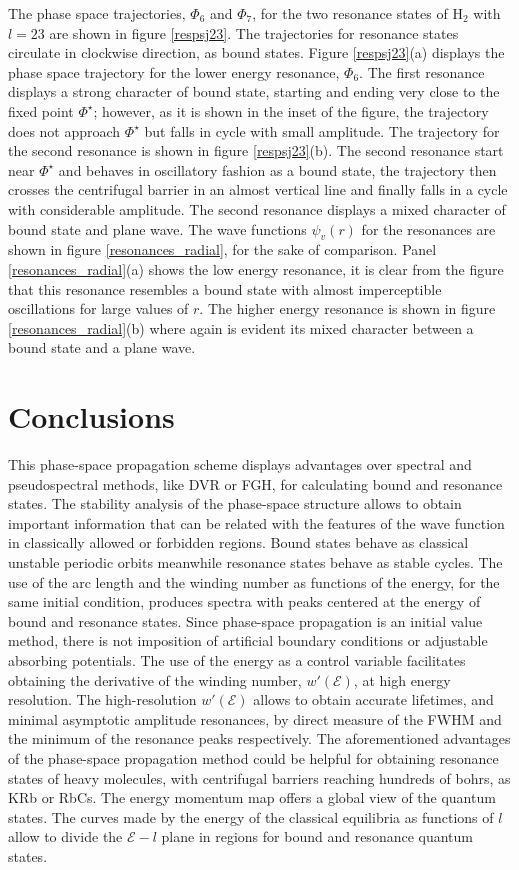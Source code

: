 \documentclass[%
 aip,
 numerical,
 jcp,
 floatfix,
rsi,%
amsmath,amssymb,
reprint,%
author-year%
]{revtex4-1}
\begin{document}
The phase space trajectories, $\Phi_6$ and $\Phi_7$, for the two resonance states of $\mathrm{H}_2$ with $l=23$ are shown in figure \ref{respsj23}. The trajectories for resonance states circulate in clockwise direction, as bound states. Figure \ref{respsj23}(a) displays the phase space trajectory for the lower energy resonance, $\Phi_6$. The first resonance displays a strong character of bound state, starting and ending very close to the fixed point $\Phi^\star$; however, as it is shown in the inset of the figure, the trajectory does not approach $\Phi^\star$ but falls in cycle with small amplitude. The trajectory for the second resonance is shown in figure \ref{respsj23}(b). The second resonance start near $\Phi^\star$ and behaves in oscillatory fashion as a bound state, the trajectory then crosses the centrifugal barrier in an almost vertical line and finally falls in a cycle with considerable amplitude. The second resonance displays a mixed character of bound state and plane wave. The wave functions $\psi_v(r)$ for the resonances are shown in figure \ref{resonances_radial}, for the sake of comparison. Panel \ref{resonances_radial}(a) shows the low energy resonance, it is clear from the figure that this resonance resembles a bound state with almost imperceptible oscillations for large values of $r$. The higher energy resonance is shown in figure \ref{resonances_radial}(b) where again is evident its mixed character between a bound state and a plane wave. 

\section{Conclusions}

This phase-space propagation scheme displays advantages over spectral and pseudospectral methods, like DVR or FGH, for calculating bound and resonance states. The stability analysis of the phase-space structure allows to obtain important information that can be related with the features of the wave function in classically allowed or forbidden regions. Bound states behave as classical unstable periodic orbits meanwhile resonance states behave as stable cycles. The use of the arc length and the winding number as functions of the energy, for the same initial condition, produces spectra with peaks centered at the energy of  bound and resonance states. Since phase-space propagation is an initial value method, there is not imposition of artificial boundary conditions or adjustable absorbing potentials. The use of the energy as a control variable facilitates obtaining the derivative of the winding number, $w'(\mathcal{E})$, at high energy resolution. The high-resolution $w'(\mathcal{E})$ allows to obtain accurate lifetimes, and minimal asymptotic amplitude resonances, by direct measure of the FWHM and the minimum of the resonance peaks respectively. The aforementioned advantages of the phase-space propagation method could be helpful for obtaining resonance states of heavy molecules, with centrifugal barriers reaching hundreds of bohrs, as KRb or RbCs. The energy momentum map offers a global view of the quantum states. The curves made by the energy of the classical equilibria as functions of $l$ allow to divide the $\mathcal{E}-l$ plane in regions for bound and resonance quantum states.   
  
\end{document}

